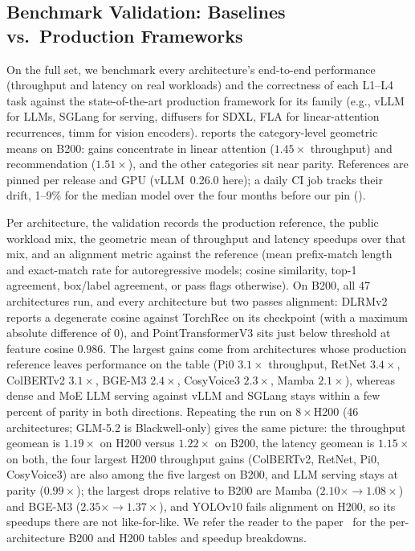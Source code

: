 \subsection{Benchmark Validation: Baselines vs.\ Production Frameworks}
\label{fastkernels:sec:eval-results}

On the full set, we benchmark every architecture's end-to-end performance (throughput and latency on real workloads) and the correctness of each L1--L4 task against the state-of-the-art production framework for its family (e.g., vLLM for LLMs, SGLang for serving, diffusers for SDXL, FLA for linear-attention recurrences, timm for vision encoders).
 reports the category-level geometric means on B200: gains concentrate in linear attention ($1.45\times$ throughput) and recommendation ($1.51\times$), and the other categories sit near parity.
References are pinned per release and GPU (vLLM~0.26.0 here); a daily CI job tracks their drift, 1--9\% for the median model over the four months before our pin ().

Per architecture, the validation records the production reference, the public workload mix, the geometric mean of throughput and latency speedups over that mix, and an alignment metric against the reference (mean prefix-match length and exact-match rate for autoregressive models; cosine similarity, top-1 agreement, box/label agreement, or pass flags otherwise).
On B200, all 47 architectures run, and every architecture but two passes alignment: DLRMv2 reports a degenerate cosine against TorchRec on its checkpoint (with a maximum absolute difference of 0), and PointTransformerV3 sits just below threshold at feature cosine $0.986$.
The largest gains come from architectures whose production reference leaves performance on the table (Pi0 $3.1\times$ throughput, RetNet $3.4\times$, ColBERTv2 $3.1\times$, BGE-M3 $2.4\times$, CosyVoice3 $2.3\times$, Mamba $2.1\times$), whereas dense and MoE LLM serving against vLLM and SGLang stays within a few percent of parity in both directions.
Repeating the run on $8\times$H200 (46 architectures; GLM-5.2 is Blackwell-only) gives the same picture: the throughput geomean is $1.19\times$ on H200 versus $1.22\times$ on B200, the latency geomean is $1.15\times$ on both, the four largest H200 throughput gains (ColBERTv2, RetNet, Pi0, CosyVoice3) are also among the five largest on B200, and LLM serving stays at parity ($0.99\times$); the largest drops relative to B200 are Mamba ($2.10\times \to 1.08\times$) and BGE-M3 ($2.35\times \to 1.37\times$), and YOLOv10 fails alignment on H200, so its speedups there are not like-for-like.
We refer the reader to the \FastKernels paper~\cite{fastkernels} for the per-architecture B200 and H200 tables and speedup breakdowns.

